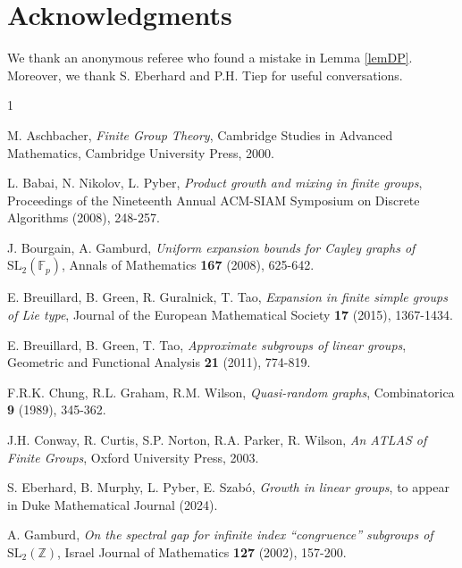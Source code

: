 \documentclass{daj}
\theoremstyle{definition}
\theoremstyle{remark}
\newcommand{\SL}{\mathrm{SL}}
\begin{document}
\section*{Acknowledgments}
We thank an anonymous referee who found a mistake in Lemma \ref{lemDP}.
Moreover, we thank S. Eberhard and P.H. Tiep for useful conversations.











\begin{thebibliography}{1} 

 M. Aschbacher,
\textit{Finite Group Theory},
Cambridge Studies in Advanced Mathematics, Cambridge University Press, 2000.

 L. Babai, N. Nikolov, L. Pyber,
\textit{Product growth and mixing in finite groups},
Proceedings of the Nineteenth Annual ACM-SIAM Symposium on Discrete Algorithms (2008), 248-257.

 J. Bourgain, A. Gamburd,
\textit{Uniform expansion bounds for Cayley graphs of $\SL_2(\mathbb{F}_p)$},
Annals of Mathematics \textbf{167} (2008), 625-642.

 E. Breuillard, B. Green, R. Guralnick, T. Tao,
\textit{Expansion in finite simple groups of Lie type},
Journal of the European Mathematical Society \textbf{17} (2015), 1367-1434.

 E. Breuillard, B. Green, T. Tao,
\textit{Approximate subgroups of linear groups},
Geometric and Functional Analysis \textbf{21} (2011), 774-819.

 F.R.K. Chung, R.L. Graham, R.M. Wilson,
\textit{Quasi-random graphs},
Combinatorica \textbf{9} (1989), 345-362.

 J.H. Conway, R. Curtis, S.P. Norton, R.A. Parker, R. Wilson,
\textit{An ATLAS of Finite Groups},
 Oxford University Press, 2003.

 S. Eberhard, B. Murphy, L. Pyber, E. Szab\'o,
\textit{Growth in linear groups},
to appear in Duke Mathematical Journal (2024).

 A. Gamburd,
\textit{On the spectral gap for infinite index ``congruence'' subgroups of $\SL_2(\mathbb{Z})$},
Israel Journal of Mathematics \textbf{127} (2002), 157-200.


\end{thebibliography}
\end{document}
